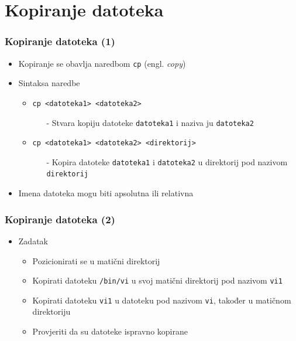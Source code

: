 \documentclass{beamer}
\begin{document}
\section{Kopiranje datoteka}
\begin{frame}[t]
\frametitle{Kopiranje datoteka (1)}
\begin{itemize}
  \item Kopiranje se obavlja naredbom \texttt{cp} (engl. \emph{copy})
  \item Sintaksa naredbe 
  \begin{itemize}
    \item \texttt{cp \textless datoteka1\textgreater 
                     \textless datoteka2\textgreater}
    \begin{itemize}
      \item[-] Stvara kopiju datoteke \texttt{datoteka1} i naziva ju 
               \texttt{datoteka2}
    \end{itemize}
    \item \texttt{cp \textless datoteka1\textgreater 
                     \textless datoteka2\textgreater 
                     \textless direktorij\textgreater}
    \begin{itemize}
      \item[-] Kopira datoteke \texttt{datoteka1} i \texttt{datoteka2} u
               direktorij pod nazivom \texttt{direktorij}
    \end{itemize}
  \end{itemize}
  \item Imena datoteka mogu biti apsolutna ili relativna
\end{itemize}
\end{frame}

\begin{frame}[t]
\frametitle{Kopiranje datoteka (2)}
\begin{itemize}
  \item Zadatak
  \begin{itemize}
    \item Pozicionirati se u matični direktorij
    \item Kopirati datoteku \texttt{/bin/vi} u svoj matični direktorij pod
          nazivom \texttt{vi1}
    \item Kopirati datoteku \texttt{vi1} u datoteku pod nazivom 
          \texttt{vi}, također u matičnom direktoriju
    \item Provjeriti da su datoteke ispravno kopirane
  \end{itemize}
\end{itemize}
\end{frame}
\end{document}
